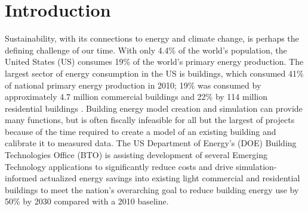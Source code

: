 \documentclass[preprint, review, 12pt]{elsarticle}
\begin{document}
\section{Introduction}
\label{sec:introduction}
Sustainability, with its connections to energy and climate change, is perhaps the defining challenge of our time. With only 4.4\% of the world's population, the United States (US) consumes 19\% of the world's primary energy production. The largest sector of energy consumption in the US is buildings, which consumed 41\% of national primary energy production in 2010; 19\% was consumed by approximately 4.7 million commercial buildings and 22\% by 114 million residential buildings \cite{cit:doe2012a}. Building energy model creation and simulation can provide many functions, but is often fiscally infeasible for all but the largest of projects because of the time required to create a model of an existing building and calibrate it to measured data. The US Department of Energy's (DOE) Building Technologies Office (BTO) is assisting development of several Emerging Technology applications to significantly reduce costs and drive simulation-informed actualized energy savings into existing light commercial and residential buildings to meet the nation’s overarching goal to reduce building energy use by 50\% by 2030 compared with a 2010 baseline.
\end{document}
